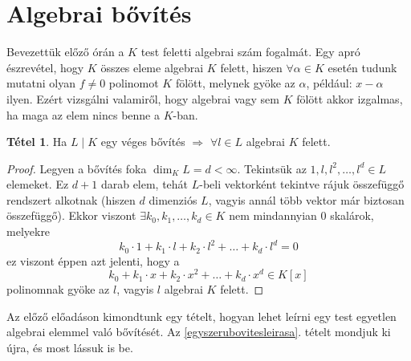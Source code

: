 \documentclass[12pt]{book}
\theoremstyle{plain} %
\theoremstyle{definition} %
\newtheorem{theo/}{Tétel}[section]
\newenvironment{theo}
  {\renewcommand{\qedsymbol}{$\clubsuit$}%
   \pushQED{\qed}\begin{theo/}}
  {\popQED\end{theo/}}
\theoremstyle{remark}
\renewcommand\qedsymbol{$\blacksquare$}
\numberwithin{equation}{section}  %
\begin{document}
	\section{Algebrai bővítés}
	Bevezettük előző órán a $K$ test feletti algebrai szám fogalmát. Egy apró észrevétel, hogy $K$ összes eleme algebrai $K$ felett, hiszen $\forall \alpha \in K$ esetén tudunk mutatni olyan $f\neq 0$ polinomot $K$ fölött, melynek gyöke az $\alpha$, például: $x-\alpha$ ilyen. Ezért vizsgálni valamiről, hogy algebrai vagy sem $K$ fölött akkor izgalmas, ha maga az elem nincs benne a $K$-ban.
	
	\begin{theo}\label{masodik}
		Ha $L \mid K$ egy véges bővítés \hspace{1mm} $\Rightarrow$ \hspace{1mm} $\forall l \in L$ algebrai $K$ felett.
	\end{theo}
	\begin{proof}
		Legyen a bővítés foka $\dim_K L = d < \infty$. Tekintsük az $1,l,l^2,\ldots,l^d\in L$ elemeket. Ez $d+1$ darab elem, tehát $L$-beli vektorként tekintve rájuk összefüggő rendszert alkotnak (hiszen $d$ dimenziós $L$, vagyis annál több vektor már biztosan összefüggő). Ekkor viszont $\exists k_0, k_1,\ldots, k_d \in K$ nem mindannyian $0$ skalárok, melyekre
		\[ k_0\cdot 1 + k_1\cdot l + k_2\cdot l^2 + \ldots + k_d\cdot l^d = 0  \]
		ez viszont éppen azt jelenti, hogy a
		\[ k_0 + k_1 \cdot x + k_2 \cdot x^2 + \ldots + k_d \cdot x^d \in K[x]  \]
		polinomnak gyöke az $l$, vagyis $l$ algebrai $K$ felett.
	\end{proof}

	Az előző előadáson kimondtunk egy tételt, hogyan lehet leírni egy test egyetlen algebrai elemmel való bővítését. Az \ref{egyszerubovitesleirasa}. tételt mondjuk ki újra, és most lássuk is be.
\end{document}
